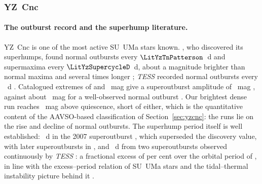 \subsubsection{YZ~Cnc}

\paragraph{The outburst record and the superhump literature.}
YZ~Cnc is one of the most active SU~UMa stars known.  \citet{patterson1979},
who discovered its superhumps, found normal outbursts every
$\LitYzTnPatterson$~d and supermaxima every $\LitYzSupercycleD$~d, about a
magnitude brighter than normal maxima and several times longer
\citep[see also][]{szkody1984, vanparadijs1994}; \emph{TESS} recorded
normal outbursts every \LitYzTnTess{}~d \citep{sun2026}.  Catalogued
extremes of \LitYzKatoMin{} and \LitYzKatoMax{}~mag give a superoutburst
amplitude of \LitYzSuperAmp{}~mag \citep{kato2002}, against about
\LitYzNormalAmp{}~mag for a well-observed normal outburst
\citep{hakala2004, vanparadijs1994}.  Our brightest dense run reaches
\NumOutburstPeakAmp{}~mag above quiescence, short of either, which is the
quantitative content of the AAVSO-based classification of
Section~\ref{sec:yzcnc}: the runs lie on the rise and decline of normal
outbursts.  The superhump period itself is well established:
\LitYzPshKato~d in the 2007 superoutburst \citep{kato2009}, which
superseded the discovery value, with later superoutbursts in
\citet{kato2014v, kato2014vi, kato2015}, and \LitYzPshTess~d from two
superoutbursts observed continuously by \emph{TESS}
\citep{dai2026, sun2026}: a fractional excess of \LitYzEpsPct{} per cent
over the orbital period of \citet{vanparadijs1994}, in line with the
excess--period relation of SU~UMa stars \citep{patterson2005} and the
tidal--thermal instability picture behind it
\citep{whitehurst1988, osaki1989, osaki1996, osaki2013}.

